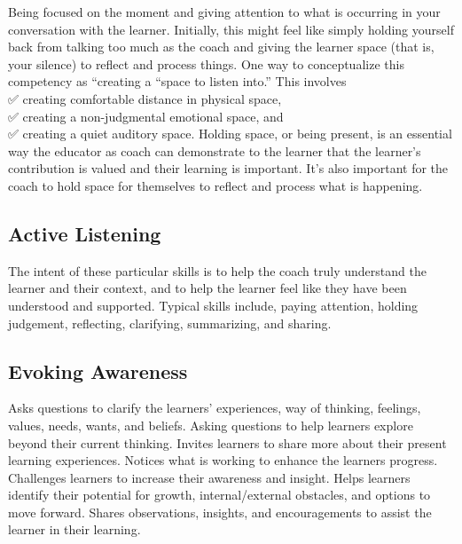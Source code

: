 \documentclass[
]{book}
\begin{document}
Being focused on the moment and giving attention to what is occurring in your conversation with the learner. Initially, this might feel like simply holding yourself back from talking too much as the coach and giving the learner space (that is, your silence) to reflect and process things. One way to conceptualize this competency as ``creating a ``space to listen into.'' This involves\\
✅ creating comfortable distance in physical space,\\
✅ creating a non-judgmental emotional space, and\\
✅ creating a quiet auditory space. Holding space, or being present, is an essential way the educator as coach can demonstrate to the learner that the learner's contribution is valued and their learning is important. It's also important for the coach to hold space for themselves to reflect and process what is happening.

\hypertarget{active-listening}{%
\subsection*{Active Listening}\label{active-listening}}

The intent of these particular skills is to help the coach truly understand the learner and their context, and to help the learner feel like they have been understood and supported. Typical skills include, paying attention, holding judgement, reflecting, clarifying, summarizing, and sharing.

\hypertarget{evoking-awareness}{%
\subsection*{Evoking Awareness}\label{evoking-awareness}}

Asks questions to clarify the learners' experiences, way of thinking, feelings, values, needs, wants, and beliefs. Asking questions to help learners explore beyond their current thinking. Invites learners to share more about their present learning experiences. Notices what is working to enhance the learners progress. Challenges learners to increase their awareness and insight. Helps learners identify their potential for growth, internal/external obstacles, and options to move forward. Shares observations, insights, and encouragements to assist the learner in their learning.
\end{document}
